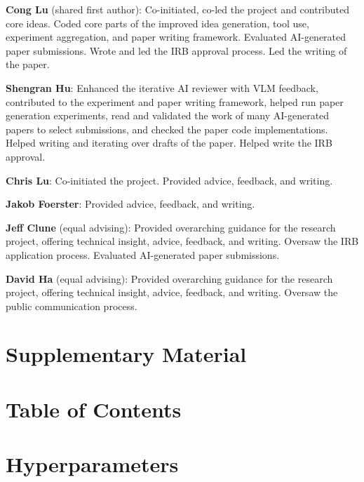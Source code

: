 \documentclass[11pt, a4paper]{include/gdm_format}
\begin{document}
\textbf{Cong Lu} (shared first author): Co-initiated, co-led the project and contributed core ideas. Coded core parts of the improved idea generation, tool use, experiment aggregation, and paper writing framework. Evaluated AI-generated paper submissions. Wrote and led the IRB approval process. Led the writing of the paper.

\textbf{Shengran Hu}: Enhanced the iterative AI reviewer with VLM feedback, contributed to the experiment and paper writing framework, helped run paper generation experiments, read and validated the work of many AI-generated papers to select submissions, and checked the paper code implementations. Helped writing and iterating over drafts of the paper. Helped write the IRB approval.

\textbf{Chris Lu}: Co-initiated the project. Provided advice, feedback, and writing.

\textbf{Jakob Foerster}: Provided advice, feedback, and writing.

\textbf{Jeff Clune} (equal advising): Provided overarching guidance for the research project, offering technical insight, advice, feedback, and writing. Oversaw the IRB application process. Evaluated AI-generated paper submissions.

\textbf{David Ha} (equal advising): Provided overarching guidance for the research project, offering technical insight, advice, feedback, and writing. Oversaw the public communication process.

\newpage

\appendix
%

\section*{\LARGE Supplementary Material}

\vspace*{20pt}
\section*{Table of Contents}
\vspace*{-5pt}
\startcontents[sections]

\clearpage

\section{Hyperparameters}
\label{appsec:hypers}
\end{document}
